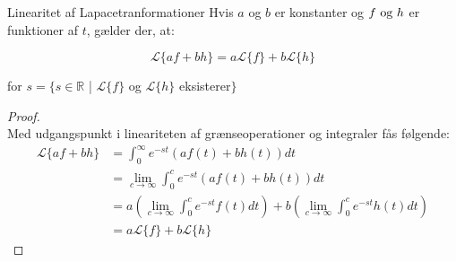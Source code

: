 \begin{mytheo}{Linearitet af Lapacetranformationer}{}
Hvis $a$ og $b$ er konstanter og $f \ \textnormal{og} \ h$ er funktioner af $t$, gælder der, at:

$$\mathcal{L}\{af + bh\} = a\mathcal{L}\{f\} + b\mathcal{L}\{h\}$$

for $s = \{ s \in \mathbb{R}$ | $\mathcal{L}\{f\}$ og $\mathcal{L}\{h\}$ eksisterer$\}$
\end{mytheo}

\begin{proof}\\
Med udgangspunkt i lineariteten af grænseoperationer og integraler fås følgende:
\begin{align*}
    \mathcal{L}\{af + bh\} &= \int_0^\infty{e^{-st}(af(t) + bh(t))} dt\\
    &= \lim_{c\to\infty} \int_0^c{e^{-st}(af(t) + bh(t))} dt\\
    &= a \left( \lim_{c\to\infty} \int_0^c{e^{-st}f(t)} dt \right) + b \left(\lim_{c\to\infty} \int_0^c{e^{-st}h(t)} dt \right)\\
    &= a\mathcal{L}\{f\} + b\mathcal{L}\{h\}
\end{align*}

\end{proof}

